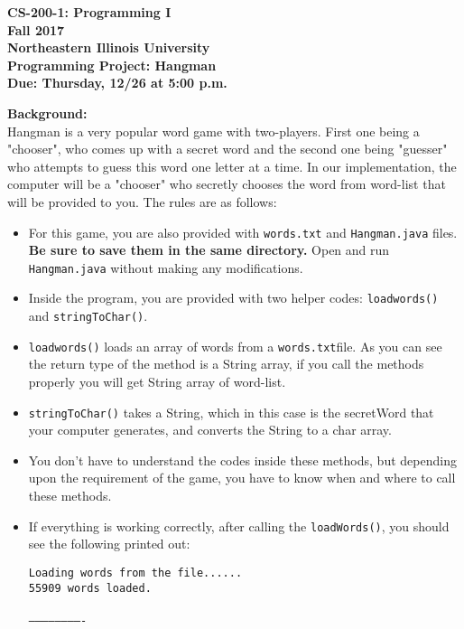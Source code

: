 \documentclass[12pt]{article}
\begin{document}
\begin{center}
	\textbf{CS-200-1: Programming I}\\
	\textbf{Fall 2017}\\
	\textbf{Northeastern Illinois University}\\
	\textbf{Programming Project: Hangman}\\
	\textbf{Due: Thursday, 12/26 at 5:00 p.m.}
\end{center}

\vspace*{0.5cm}
\noindent\textbf{Background:}\\
Hangman is a very popular word game with two-players. First one being a "chooser", who comes up with a secret word and the second one being "guesser" who attempts to guess this word one letter at a time. In our implementation, the computer will be a "chooser" who secretly chooses the word from word-list that will be provided to you. The rules are as follows:
\begin{itemize}
	\item For this game, you  are also provided with \texttt{words.txt} and \texttt{Hangman.java} files. \textbf{Be sure to save them in the same directory.} Open and run \texttt{Hangman.java} without making any modifications.
	\item Inside the program, you are provided with two helper codes:  \texttt{loadwords()} and \texttt{stringToChar()}.
	\item \texttt{loadwords()} loads an array of words from a \texttt{words.txt}file. As you can see the return type of the method is a String array, if you call the methods properly you will get String array of word-list.
	\item \texttt{stringToChar()} takes a String, which in this case is the secretWord that your computer generates, and converts the String to a char array. 
	\item You don't have to understand the codes inside these methods, but depending upon the requirement of the game, you have to know when and where to call these methods.
	\item If everything is working correctly, after calling the \texttt{loadWords()},  you should see the following printed out:
\begin{center}
	\begin{minipage}{9cm}
		\texttt{Loading words from the file......}\\
		\texttt{55909 words loaded.}\\
		\texttt{\textendash \textendash}\\
		\texttt{-------------------------}
	\end{minipage}
\end{center}

	
\end{itemize}
\end{document}
